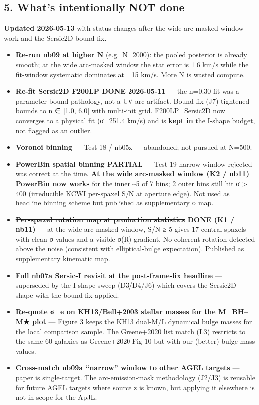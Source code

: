 \documentclass[
  10pt,
]{article}
\providecommand{\tightlist}{%
  \setlength{\itemsep}{0pt}\setlength{\parskip}{0pt}}
\begin{document}
\hypertarget{whats-intentionally-not-done}{%
\subsection{5. What's intentionally NOT done}\label{whats-intentionally-not-done}}

\textbf{Updated 2026-05-13} with status changes after the wide arc-masked window work and the Sersic2D bound-fix.

\begin{itemize}
\tightlist
\item
  \textbf{Re-run nb09 at higher N} (e.g.~N=2000): the pooled posterior is already smooth; at the wide arc-masked window the stat error is ±6 km/s while the fit-window systematic dominates at ±15 km/s.
  More N is wasted compute.
\item
  \textbf{\sout{Re-fit Sersic2D F200LP} DONE 2026-05-11} --- the n=0.30 fit was a parameter-bound pathology, not a UV-arc artifact. Bound-fix (J7) tightened bounds to n ∈ {[}1.0, 6.0{]} with
  multi-init grid. F200LP\_Sersic2D now converges to a physical fit (σ=251.4 km/s) and is \textbf{kept in} the I-shape budget, not flagged as an outlier.
\item
  \textbf{Voronoi binning} --- Test 18 / nb05x --- abandoned; not pursued at N=500.
\item
  \textbf{\sout{PowerBin spatial binning} PARTIAL} --- Test 19 narrow-window rejected was correct at the time. \textbf{At the wide arc-masked window (K2 / nb11) PowerBin now works} for the inner
  \textasciitilde5 of 7 bins; 2 outer bins still hit σ \textgreater{} 400 (irreducible KCWI per-spaxel S/N at aperture edge). Not used as headline binning scheme but published as supplementary σ map.
\item
  \textbf{\sout{Per-spaxel rotation map at production statistics} DONE (K1 / nb11)} --- at the wide arc-masked window, S/N ≥ 5 gives 17 central spaxels with clean σ values and a visible σ(R) gradient.
  No coherent rotation detected above the noise (consistent with elliptical-bulge expectation). Published as supplementary kinematic map.
\item
  \textbf{Full nb07a Sersic-I revisit at the post-frame-fix headline} --- superseded by the I-shape sweep (D3/D4/J6) which covers the Sersic2D shape with the bound-fix applied.
\item
  \textbf{Re-quote σ\_e on KH13/Bell+2003 stellar masses for the M\_BH--M★ plot} --- Figure 3 keeps the KH13 dual-M/L dynamical bulge masses for the local comparison sample. The Greene+2020 list match
  (L3) restricts to the same 60 galaxies as Greene+2020 Fig 10 but with our (better) bulge mass values.
\item
  \textbf{Cross-match nb09a ``narrow'' window to other AGEL targets} --- paper is single-target. The arc-emission-mask methodology (J2/J3) is reusable for future AGEL targets where source z is known,
  but applying it elsewhere is not in scope for the ApJL.
\end{itemize}
\end{document}
